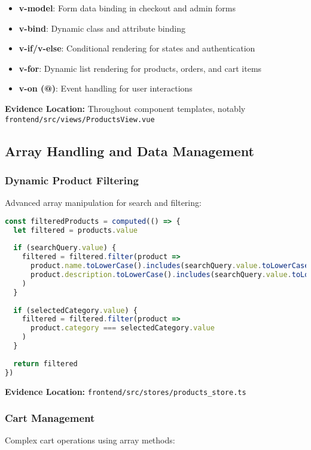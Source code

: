 \documentclass[12pt,a4paper]{article}
\begin{document}
\begin{itemize}
    \item \textbf{v-model}: Form data binding in checkout and admin forms
    \item \textbf{v-bind}: Dynamic class and attribute binding
    \item \textbf{v-if/v-else}: Conditional rendering for states and authentication
    \item \textbf{v-for}: Dynamic list rendering for products, orders, and cart items
    \item \textbf{v-on (@)}: Event handling for user interactions
\end{itemize}

\textbf{Evidence Location:} Throughout component templates, notably \texttt{frontend/src/views/ProductsView.vue}

\subsection{Array Handling and Data Management}

\subsubsection{Dynamic Product Filtering}
Advanced array manipulation for search and filtering:

\begin{lstlisting}[language=javascript, caption=Product Filtering Logic]
const filteredProducts = computed(() => {
  let filtered = products.value
  
  if (searchQuery.value) {
    filtered = filtered.filter(product =>
      product.name.toLowerCase().includes(searchQuery.value.toLowerCase()) ||
      product.description.toLowerCase().includes(searchQuery.value.toLowerCase())
    )
  }
  
  if (selectedCategory.value) {
    filtered = filtered.filter(product => 
      product.category === selectedCategory.value
    )
  }
  
  return filtered
})
\end{lstlisting}

\textbf{Evidence Location:} \texttt{frontend/src/stores/products\_store.ts}

\subsubsection{Cart Management}
Complex cart operations using array methods:
\end{document}
